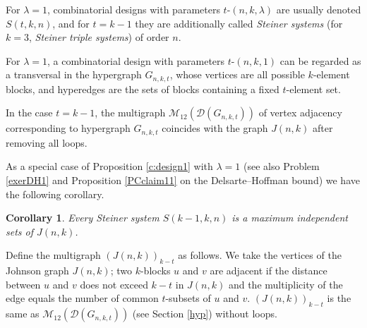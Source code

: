 \documentclass[11pt]{article}
\newtheorem{corollary}{Corollary}[section]
\theoremstyle{definition}
\begin{document}
{{{For $\lambda=1$, combinatorial designs with parameters
$t$-$(n,k,\lambda)$ are usually denoted $S(t,k,n)$, and for $t=k-1$
they are additionally called {\sl Steiner systems} (for $k=3$, {\sl Steiner triple
systems}) of order $n$.

For $\lambda=1$, a combinatorial design with parameters $t$-$(n,k,1)$
can be regarded  as a transversal in the hypergraph $G_{n,k,t}$,
whose vertices are all possible $k$-element blocks, and
hyperedges
are the sets of blocks containing a fixed $t$-element
set.

In the case $t=k-1$, the multigraph
$\mathcal{M}_{12}(\mathcal{D}(G_{n,k,t}))$ of vertex adjacency corresponding to
hypergraph $G_{n,k,t}$ coincides with
the graph $J(n,k)$  after removing all loops.

 As a special case of Proposition
\ref{c:design1} with $\lambda=1$ (see also Problem \ref{exerDH1} and
Proposition \ref{PCclaim11} on the Delsarte--Hoffman bound) we have the following corollary.

\begin{corollary}
Every Steiner system $S(k-1,k,n)$ is a maximum independent
sets  of $J(n,k)$.
\end{corollary}

Define the multigraph $(J(n,k))_{k-t}$ as follows. We take the vertices of the Johnson graph 
$J(n,k)$; two $k$-blocks  $u$ and $v$ are adjacent if the distance between $u$ and $v$ does not exceed  $k-t$ in $J(n,k)$ and the multiplicity of the edge equals the number of common  $t$-subsets of $u$ and $v$.
$(J(n,k))_{k-t}$ is the same as 
$\mathcal{M}_{12}(\mathcal{D}(G_{n,k,t}))$ (see Section \ref{hyp}) without loops.

}}}
\end{document}
